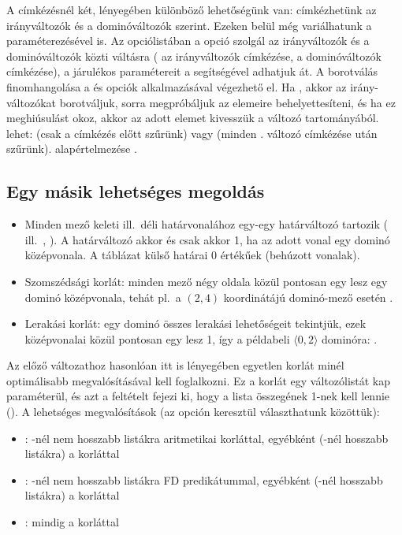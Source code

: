 A címkézésnél két, lényegében különböző lehetőségünk van: címkézhetünk az irányváltozók és
a dominóváltozók szerint. Ezeken belül még variálhatunk a  paraméterezésével
is. Az opciólistában a  opció szolgál az irányváltozók és a dominóváltozók
közti váltásra ( az irányváltozók címkézése,  a dominóváltozók
címkézése), a  járulékos paramétereit a  segítségével
adhatjuk át. A borotválás finomhangolása a  és  opciók
alkalmazásával végezhető el. Ha , akkor az irány-változókat borotváljuk,
sorra megpróbáljuk az  elemeire behelyettesíteni, és ha ez meghiúsulást okoz, akkor
az adott elemet kivesszük a változó tartományából.  lehet:  (csak a
címkézés előtt szűrünk) vagy  (minden . változó címkézése után szűrünk).
 alapértelmezése \cd{[{\em w},{\em n}]}.

\subsection{Egy másik lehetséges megoldás}

\begin{itemize}
\item Minden mező keleti ill.\ déli határvonalához egy-egy határváltozó
        tartozik ( ill.\ , ). A határváltozó akkor
        és csak akkor 1, ha az adott vonal egy dominó középvonala. A
        táblázat külső határai 0 értékűek (behúzott vonalak).
\item Szomszédsági korlát: minden mező négy oldala közül pontosan egy lesz
egy dominó középvonala, tehát pl.\ a $(2,4)$ koordinátájú dominó-mező esetén
.
\item Lerakási korlát: egy dominó összes lerakási lehetőségeit tekintjük,
ezek középvonalai közül pontosan egy lesz 1, így a példabeli
$\langle0,2\rangle$ dominóra: .
\end{itemize}

Az előző változathoz hasonlóan itt is lényegében egyetlen korlát minél optimálisabb
megvalósításával kell foglalkozni. Ez a korlát egy változólistát kap paraméterül,
és azt a feltételt fejezi ki, hogy a lista összegének 1-nek kell lennie
(). A lehetséges megvalósítások (az  opción
keresztül választhatunk közöttük):

\begin{itemize}
        \item {}: -nél nem hosszabb listákra aritmetikai korláttal,
	egyébként (-nél hosszabb listákra) a  korláttal
        \item {}: -nél nem hosszabb listákra FD predikátummal,
	egyébként (-nél hosszabb listákra) a  korláttal
        \item {}: mindig a  korláttal
\end{itemize}

